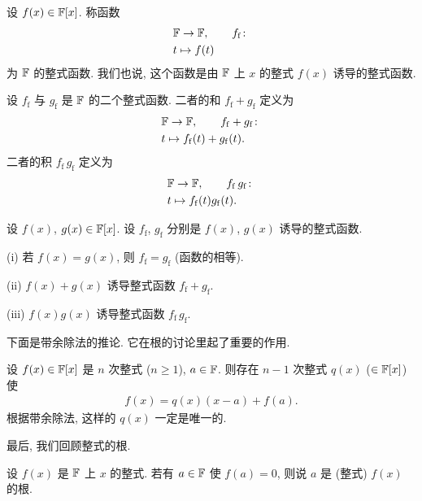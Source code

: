\begin{definition}
    设 $f(x) \in \mathbb{F}[x]$. 称函数
    \begin{align*}
         & \FF \to \FF, \tag*{$f_\mathrm{f} \colon$} \\
         & t \mapsto f(t)
    \end{align*}
    为 $\mathbb{F}$ 的整式函数. 我们也说, 这个函数是由 $\mathbb{F}$ 上 $x$ 的整式 $f(x)$ 诱导的整式函数.
\end{definition}

\begin{definition}
    设 $f_\mathrm{f}$ 与 $g_\mathrm{f}$ 是 $\mathbb{F}$ 的二个整式函数. 二者的和 $f_\mathrm{f} + g_\mathrm{f}$ 定义为
    \begin{align*}
         & \FF \to \FF, \tag*{$f_\mathrm{f} + g_\mathrm{f} \colon$} \\
         & t \mapsto f_\mathrm{f} (t) + g_\mathrm{f} (t).
    \end{align*}
    二者的积 $f_\mathrm{f} \, g_\mathrm{f}$ 定义为
    \begin{align*}
         & \FF \to \FF, \tag*{$f_\mathrm{f} \, g_\mathrm{f} \colon$} \\
         & t \mapsto f_\mathrm{f} (t) g_\mathrm{f} (t).
    \end{align*}
\end{definition}

\begin{proposition}
    设 $f(x)$, $g(x) \in \mathbb{F}[x]$. 设 $f_\mathrm{f}$, $g_\mathrm{f}$ 分别是 $f(x)$, $g(x)$ 诱导的整式函数.

    (i) 若 $f(x) = g(x)$, 则 $f_\mathrm{f} = g_\mathrm{f}$ (函数的相等).

    (ii) $f(x) + g(x)$ 诱导整式函数 $f_\mathrm{f} + g_\mathrm{f}$.

    (iii) $f(x) g(x)$ 诱导整式函数 $f_\mathrm{f} \, g_\mathrm{f}$.
\end{proposition}

下面是带余除法的推论. 它在根的讨论里起了重要的作用.
\begin{proposition}
    设 $f(x) \in \mathbb{F}[x]$ 是 $n$ 次整式 ($n \geq 1$), $a \in \mathbb{F}$. 则存在 $n-1$ 次整式 $q(x)$ ($\in \mathbb{F}[x]$) 使
    \begin{align*}
        f(x) = q(x) (x-a) + f(a).
    \end{align*}
    根据带余除法, 这样的 $q(x)$ 一定是唯一的.
\end{proposition}

最后, 我们回顾整式的根.

\begin{definition}
    设 $f(x)$ 是 $\mathbb{F}$ 上 $x$ 的整式. 若有 $a \in \mathbb{F}$ 使 $f(a) = 0$, 则说 $a$ 是 (整式) $f(x)$ 的根.
\end{definition}

